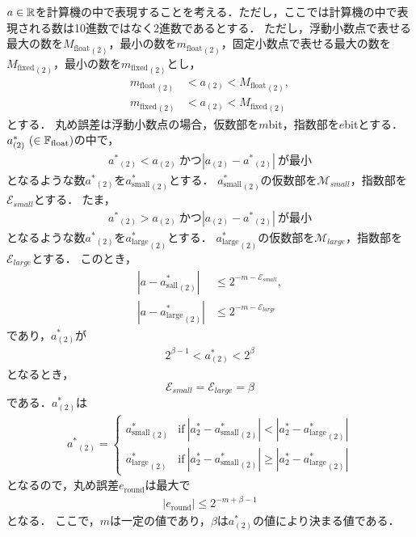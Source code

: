 $a \in \mathbb{R}$を計算機の中で表現することを考える．ただし，ここでは計算機の中で表現される数は10進数ではなく2進数であるとする．
ただし，浮動小数点で表せる最大の数を${M_{\mathrm{float}}}_{(2)}$，最小の数を${m_{\mathrm{float}}}_{(2)}$，固定小数点で表せる最大の数を${M_{\mathrm{fixed}}}_{(2)}$，最小の数を${m_{\mathrm{fixed}}}_{(2)}$とし，
\begin{align}
   {m_{\mathrm{float}}}_{(2)} &< a_{(2)} < {M_{\mathrm{float}}}_{(2)}, \\
   {m_{\mathrm{fixed}}}_{(2)} &< a_{(2)} < {M_{\mathrm{fixed}}}_{(2)}
\end{align}
とする．
丸め誤差は浮動小数点の場合，仮数部を$m$bit，指数部を$e$bitとする．
$a^{\ast}_{(2)} \ (\in \mathbb{F}_{\text{float}})$の中で，
\begin{align}
    {a^{\ast}}_{(2)} < a_{(2)}\ \text{かつ} |a_{(2)} - {a^{\ast}}_{(2)}| \ \text{が最小}
\end{align}
となるような数${a^{\ast}}_{(2)}$を${a^{\ast}_{\mathrm{small}}}_{(2)}$とする．
${a^{\ast}_{\mathrm{small}}}_{(2)}$の仮数部を$\mathcal{M}_{small}$，指数部を$\mathcal{E}_{small}$とする．
たま，
\begin{align}
    {a^{\ast}}_{(2)} > a_{(2)} \ \text{かつ} |a_{(2)} - {a^{\ast}}_{(2)}| \ \text{が最小}
\end{align}
となるような数${a^{\ast}}_{(2)}$を${a^{\ast}_{\mathrm{large}}}_{(2)}$とする．
${a^{\ast}_{\mathrm{large}}}_{(2)}$の仮数部を$\mathcal{M}_{large}$，指数部を$\mathcal{E}_{large}$とする．
このとき，
\begin{align}
    |a - {a^{\ast}_{\mathrm{sall}}}_{(2)}| &\leq 2^{-m-{\mathcal{E}_{small}}}, \\
    |a - {a^{\ast}_{\mathrm{large}}}_{(2)}| &\leq 2^{-m-{\mathcal{E}_{large}}}
\end{align}
であり，$a^{\ast}_{(2)}$が
\begin{align}
    2^{\beta -1} < a^{\ast}_{(2)} < 2^{\beta}
\end{align}
となるとき，
\begin{equation}
    \mathcal{E}_{small} = \mathcal{E}_{large} = \beta
\end{equation}
である．$a^{\ast}_{(2)}$は
\begin{align}
    {a^{\ast}}_{(2)} = \left\{ 
        \begin{array}{ll}
            {a^{\ast}_{\mathrm{small}}}_{(2)} &\text{if} \ |a^{\ast}_{2} - {a^{\ast}_{\mathrm{small}}}_{(2)} | < |a^{\ast}_{2} - {a^{\ast}_{\mathrm{large}}}_{(2)} | \\
            {a^{\ast}_{\mathrm{large}}}_{(2)} &\text{if} \ |a^{\ast}_{2} - {a^{\ast}_{\mathrm{small}}}_{(2)} | \geq |a^{\ast}_{2} - {a^{\ast}_{\mathrm{large}}}_{(2)} | 
        \end{array}
    \right.
\end{align}
となるので，丸め誤差$e_{\mathrm{round}}$は最大で
\begin{align}
    \label{eq:rounderror_float}
    |e_{\mathrm{round}}| \leq 2^{-m+\beta -1}
\end{align}
となる．
ここで，$m$は一定の値であり，$\beta$は$a^{\ast}_{(2)}$の値により決まる値である．


